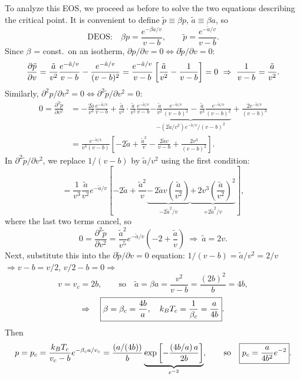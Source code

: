 To analyze this EOS, we proceed as before to solve the two equations describing the critical point. It is convenient
to define $\tilde p\equiv\beta p$, $\tilde a\equiv\beta a$, so
\begin{equation}
  \text{DEOS:}\quad \beta p = \frac{e^{-\beta a/v}}{v-b},\qquad \tilde p = \frac{e^{-\tilde a/v}}{v-b}.
\end{equation}
Since $\beta$ = const.\ on an isotherm, $\partial p/\partial v = 0\Leftrightarrow\partial \tilde p/\partial v = 0$:
\begin{equation}
  \frac{\partial \tilde p}{\partial v} = \frac{\tilde a}{v^2}\frac{e^{-\tilde a/v}}{v-b} - \frac{e^{-\tilde a/v}}{(v-b)^2}
  = \frac{e^{-\tilde a/v}}{v-b}\left[\frac{\tilde a}{v^2} - \frac{1}{v-b}\right] = 0
  \ \Rightarrow\ \frac{1}{v-b} = \frac{\tilde a}{v^2}.
\end{equation}
Similarly, $\partial^2p/\partial v^2 = 0\Leftrightarrow\partial^2\tilde p/\partial v^2 = 0$:
\begin{align}
  0 = \frac{\partial^2\tilde p}{\partial v^2}
   &= -\frac{2\tilde a}{v^3}\frac{e^{-\tilde a/v}}{v-b} + \frac{\tilde a}{v^2}\cdot\frac{\tilde a}{v^2}\frac{e^{-\tilde a/v}}{v-b}
      \underbrace{- \frac{\tilde a}{v^2}\frac{e^{-\tilde a/v}}{(v-b)^2} - \frac{\tilde a}{v^2}\frac{e^{-\tilde a/v}}{(v-b)^2}}_{-(2\tilde a/v^2)e^{-\tilde a/v}/(v-b)^2}
      + \frac{2e^{-\tilde a/v}}{(v-b)^3}\nonumber\\
   &= \frac{e^{-\tilde a/v}}{v^3(v-b)}\left[-2\tilde a + \frac{\tilde a^2}{v} - \frac{2\tilde av}{v-b} + \frac{2v^3}{(v-b)^2}\right].
\end{align}
In $\partial^2\tilde p/\partial v^2$, we replace $1/(v-b)$ by $\tilde a/v^2$ using the first
condition:
\begin{equation}
  = \frac{1}{v^3}\frac{\tilde a}{v^2}e^{-\tilde a/v}\left[-2\tilde a + \frac{\tilde a^2}{v}
    \underbrace{-\,2\tilde av\left(\frac{\tilde a}{v^2}\right)}_{-2\tilde a^2/v}
    \underbrace{+\,2v^3\left(\frac{\tilde a}{v^2}\right)^2}_{+2\tilde a^2/v}\right],
\end{equation}
where the last two terms cancel, so
\begin{equation}
  0 = \frac{\partial^2\tilde p}{\partial v^2} = \frac{\tilde a^2}{v^5}e^{-\tilde a/v}\left(-2+\frac{\tilde a}{v}\right)
  \ \Rightarrow\ \tilde a = 2v .
\end{equation}
Next, substitute this into the $\partial \tilde p/\partial v = 0$ equation: $1/(v-b) = \tilde a/v^2 = 2/v$
$\Rightarrow v-b = v/2$, $v/2 - b = 0\Rightarrow$
\begin{equation}
  \boxed{v = v_c = 2b},\qquad\text{so}\quad \tilde a = \beta a = \frac{v^2}{v-b} = \frac{(2b)^2}{b} = 4b,
\end{equation}
\begin{equation}
  \Rightarrow\quad\boxed{\beta = \beta_c = \frac{4b}{a},\quad k_{B} T_c = \frac{1}{\beta_c} = \frac{a}{4b}}.
\end{equation}
Then
\begin{equation}
  p = p_c = \frac{k_{B} T_c}{v_c-b}e^{-\beta_ca/v_c} = \frac{\left(a/(4b)\right)}{b}\underbrace{\exp\left[-\frac{\left(4b/a\right)a}{2b}\right]}_{e^{-2}},
  \qquad\text{so}\quad\boxed{p_c = \frac{a}{4b^2}e^{-2}}.
\end{equation}

